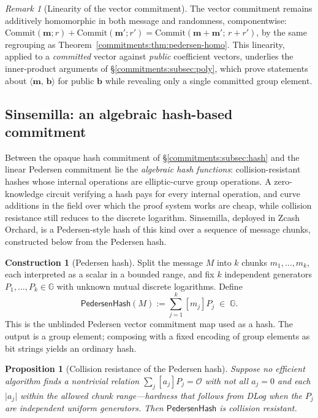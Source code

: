 \documentclass[11pt,a4paper]{article}
\newtheorem{proposition}[theorem]{Proposition}
\theoremstyle{definition}
\newtheorem{construction}[theorem]{Construction}
\theoremstyle{remark}
\newtheorem{remark}[theorem]{Remark}
\newcommand{\G}{\ensuremath{\mathbb{G}}}
\newcommand{\ip}[2]{\langle #1,\, #2 \rangle}
\providecommand{\abs}[1]{\lvert #1 \rvert}
\begin{document}
\begin{remark}[Linearity of the vector commitment]
\label{commitments:rem:vector-homo}
The vector commitment remains additively homomorphic in both message
and randomness, componentwise:
\(\mathrm{Commit}(\mathbf m; r) + \mathrm{Commit}(\mathbf m'; r')
 = \mathrm{Commit}(\mathbf m + \mathbf m';\, r + r')\), by the same
regrouping as Theorem~\ref{commitments:thm:pedersen-homo}. This
linearity, applied to a \emph{committed} vector against \emph{public}
coefficient vectors, underlies the inner-product arguments
of \S\ref{commitments:subsec:poly}, which prove statements about
\(\ip{\mathbf m}{\mathbf b}\) for public \(\mathbf b\) while
revealing only a single committed group element.
\end{remark}

\subsection{Sinsemilla: an algebraic hash-based commitment}
\label{commitments:subsec:sinsemilla}

Between the opaque hash commitment of
\S\ref{commitments:subsec:hash} and the linear Pedersen commitment lie
the \emph{algebraic hash functions}: collision-resistant hashes whose
internal operations are elliptic-curve group operations. A
zero-knowledge circuit verifying a hash pays for every internal
operation, and curve additions in the field over which the proof system
works are cheap, while collision resistance still reduces to the
discrete logarithm.
Sinsemilla, deployed in Zcash Orchard, is a Pedersen-style hash of this
kind over a sequence of message chunks, constructed below from the
Pedersen hash.

\begin{construction}[Pedersen hash]
\label{commitments:def:pedersen-hash}
Split the message \(M\) into \(k\) chunks \(m_1, \dots, m_k\), each
interpreted as a scalar in a bounded range, and fix \(k\) independent
generators \(P_1, \dots, P_k \in \G\) with unknown mutual discrete
logarithms. Define
\[
\mathsf{PedersenHash}(M) := \sum_{j=1}^{k} [m_j]P_j \;\in\; \G .
\]
This is the unblinded Pedersen vector commitment map used as a hash.
The output is a group element; composing with a fixed encoding of
group elements as bit strings yields an ordinary hash.
\end{construction}

\begin{proposition}[Collision resistance of the Pedersen hash]
\label{commitments:prop:pedersen-hash-cr}
Suppose no efficient algorithm finds a nontrivial relation
\(\sum_j [a_j]P_j = \mathcal O\) with not all \(a_j = 0\) and each
\(\abs{a_j}\) within the allowed chunk range---hardness that follows
from DLog when the \(P_j\) are independent uniform generators. Then
\(\mathsf{PedersenHash}\) is collision resistant.
\end{proposition}
\end{document}
